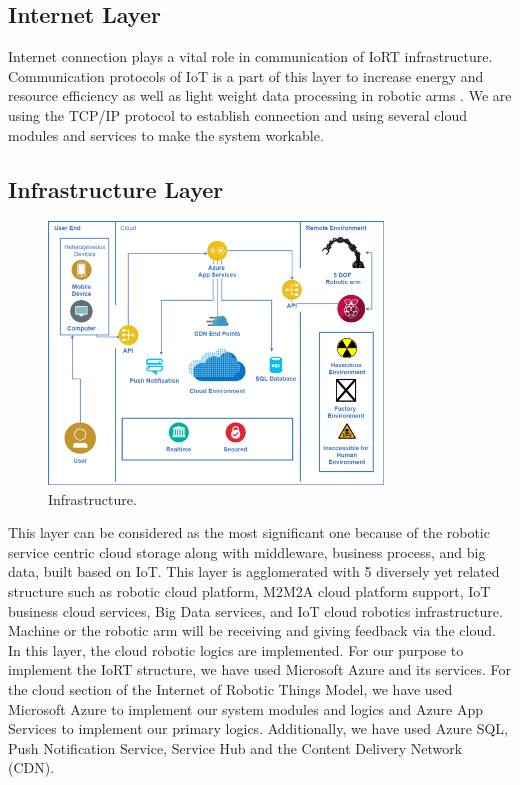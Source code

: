 \documentclass[conference]{IEEEtran}
\begin{document}
\subsection{Internet Layer}
Internet connection plays a vital role in communication of IoRT infrastructure. Communication protocols of IoT is a part of this layer to increase energy and resource efficiency as well as light weight data processing in robotic arms \cite{nine}. We are using the TCP/IP protocol to establish connection and using several cloud modules and services to make the system workable.

\subsection{Infrastructure Layer}

\begin{figure}[ht!] %
 \centering
 \includegraphics[width=3.5in]{Picture5.png}
 \caption{Infrastructure.}
 \label{Infrastructure}
 \end{figure}
 
This layer can be considered as the most significant one because of the robotic service centric cloud storage along with middleware, business process, and big data, built based on IoT. This layer is agglomerated with 5 diversely yet related structure such as robotic cloud platform, M2M2A cloud platform support, IoT business cloud services, Big Data services, and IoT cloud robotics infrastructure. Machine or the robotic arm will be receiving and giving feedback via the cloud. In this layer, the cloud robotic logics are implemented. For our purpose to implement the IoRT structure, we have used Microsoft Azure and its services. For the cloud section of the Internet of Robotic Things Model, we have used Microsoft Azure to implement our system modules and logics and Azure App Services to implement our primary logics. Additionally, we have used Azure SQL, Push Notification Service, Service Hub and the Content Delivery Network (CDN).
\end{document}
